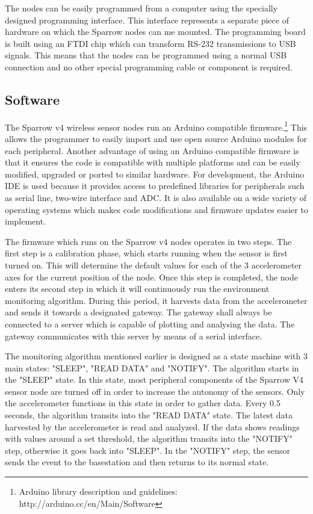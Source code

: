 The nodes can be easily programmed from a computer using the specially designed programming interface. This interface represents a separate piece of hardware
on which the Sparrow nodes can me mounted. The programming board is built using an FTDI chip which can transform RS-232 transmissions to USB signals. This means 
that the nodes can be programmed using a normal USB connection and no other special programming cable or component is required.

\subsection{Software}

The Sparrow v4 wireless sensor nodes run an Arduino compatible firmware.\footnote{Arduino library description and guidelines: http://arduino.cc/en/Main/Software}
This allows the programmer to easily import 
and use open source Arduino modules for each peripheral. Another advantage of using an Arduino compatible firmware is that it ensures the code is 
compatible with multiple platforms and can be easily modified, upgraded or ported to similar hardware. For development, the Arduino IDE is used 
because it provides access to predefined libraries for peripherals such as serial line, two-wire interface and ADC. It is also available on a wide 
variety of operating systems which makes code modifications and firmware updates easier to implement.

The firmware which runs on the Sparrow v4 nodes operates in two steps. The first step is a calibration phase, which starts running when the sensor 
is first turned on. This will determine the default values for each of the 3 accelerometer axes for the current position of the node. Once this step 
is completed, the node enters its second step in which it will continuously run the environment monitoring algorithm. During this period, it harvests data 
from the accelerometer and sends it towards a designated gateway. The gateway shall always be connected to a server 
which is capable of plotting and analysing the data. The gateway communicates with this server by means of a serial interface.

The monitoring algorithm mentioned earlier is designed as a state machine with 3 main states: "SLEEP", "READ DATA" and "NOTIFY". The algorithm starts in the 
"SLEEP" state. In this state, most peripheral components of the Sparrow V4 sensor node are turned off in order to increase the autonomy of the sensors. Only 
the accelerometer functions in this state in order to gather data. Every 0.5 seconds, the algorithm transits into the "READ DATA" state. The latest data harvested 
by the accelerometer is read and analyzed. If the data shows readings with values around a set threshold, the algorithm transits into the "NOTIFY" step, otherwise it goes back 
into "SLEEP". In the "NOTIFY" step, the sensor sends the event to the basestation and then returns to its normal state.

